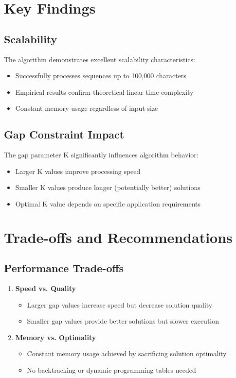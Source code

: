 \documentclass[11pt,a4paper]{article}
\begin{document}
\section{Key Findings}

\subsection{Scalability}
The algorithm demonstrates excellent scalability characteristics:
\begin{itemize}
    \item Successfully processes sequences up to 100,000 characters
    \item Empirical results confirm theoretical linear time complexity
    \item Constant memory usage regardless of input size
\end{itemize}

\subsection{Gap Constraint Impact}
The gap parameter K significantly influences algorithm behavior:
\begin{itemize}
    \item Larger K values improve processing speed
    \item Smaller K values produce longer (potentially better) solutions
    \item Optimal K value depends on specific application requirements
\end{itemize}

\section{Trade-offs and Recommendations}

\subsection{Performance Trade-offs}

\begin{enumerate}
    \item \textbf{Speed vs. Quality}
    \begin{itemize}
        \item Larger gap values increase speed but decrease solution quality
        \item Smaller gap values provide better solutions but slower execution
    \end{itemize}
    
    \item \textbf{Memory vs. Optimality}
    \begin{itemize}
        \item Constant memory usage achieved by sacrificing solution optimality
        \item No backtracking or dynamic programming tables needed
    \end{itemize}
\end{enumerate}
\end{document}

